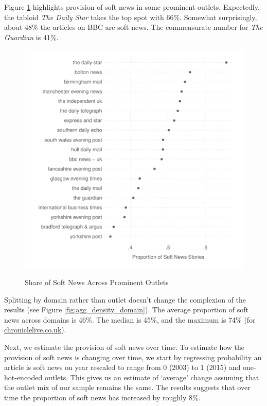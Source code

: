 \documentclass[12pt, letterpaper]{article}
\begin{document}
Figure \ref{fig:uk_dot_plot} highlights provision of soft news in some prominent outlets. Expectedly, the tabloid \textit{The Daily Star} takes the top spot with 66\%. Somewhat surprisingly, about 48\% the articles on BBC are soft news. The commensurate number for \textit{The Guardian} is 41\%. 

\begin{figure}[!htbp]
\centering
\caption{Share of Soft News Across Prominent Outlets}
\includegraphics[scale = .9]{../figs/uk_not_news_by_outlet_main_dotplot.pdf}
\label{fig:uk_dot_plot}
\end{figure}

Splitting by domain rather than outlet doesn't change the complexion of the results (see Figure \ref{fig:agg_density_domain}). The average proportion of soft news across domains is 46\%. The median is 45\%, and the maximum is 74\% (for \url{chroniclelive.co.uk}).

Next, we estimate the provision of soft news over time. To estimate how the provision of soft news is changing over time, we start by regressing probability an article is soft news on year rescaled to range from 0 (2003) to 1 (2015) and one-hot-encoded outlets. This gives us an estimate of `average' change assuming that the outlet mix of our sample remains the same. The results suggests that over time the proportion of soft news has increased by roughly 8\%. 
\end{document}
